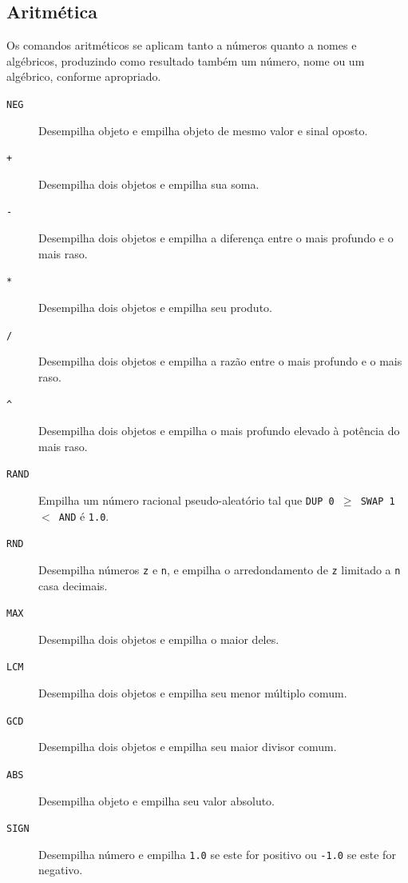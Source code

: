 \documentclass[12pt,a4paper]{report}
\newcommand{\kwd}[1]{\texttt{\textcolor{keyword}{#1}}}
\newcommand{\DUP}{\kwd{DUP}}   %
\newcommand{\SWAP}{\kwd{SWAP}}   %
\newcommand{\AND}{\kwd{AND}}   %
\newcommand{\LESS}{\kwd{$<$}}   %
\newcommand{\GEQ}{\kwd{$\geq$}}   %
\newcommand{\NEG}{\kwd{NEG}}   %
\newcommand{\PLUS}{\kwd{+}}   %
\newcommand{\MINUS}{\kwd{-}}   %
\newcommand{\MUL}{\kwd{*}}   %
\newcommand{\DIV}{\kwd{/}}   %
\newcommand{\POWER}{\kwd{\^{}}}   %
\newcommand{\RAND}{\kwd{RAND}}   %
\newcommand{\RND}{\kwd{RND}}   %
\newcommand{\MAX}{\kwd{MAX}}   %
\newcommand{\LCM}{\kwd{LCM}}   %
\newcommand{\GCD}{\kwd{GCD}}   %
\newcommand{\ABS}{\kwd{ABS}}   %
\newcommand{\SIGN}{\kwd{SIGN}}   %
\numberwithin{theorem}{chapter}
\begin{document}
\subsection{Aritmética}

Os comandos aritméticos se aplicam tanto a números quanto a nomes e
algébricos, produzindo como resultado também um número, nome ou um
algébrico, conforme apropriado.

\begin{description}

  \item[\NEG]\label{NEG} Desempilha objeto e empilha objeto de mesmo
    valor e sinal oposto.

  \item[\PLUS]\label{PLUS} Desempilha dois objetos e empilha sua soma.

  \item[\MINUS]\label{MINUS} Desempilha dois objetos e empilha a
    diferença entre o mais profundo e o mais raso.

  \item[\MUL]\label{MUL} Desempilha dois objetos e empilha seu
    produto.

  \item[\DIV]\label{DIV} Desempilha dois objetos e empilha a razão
    entre o mais profundo e o mais raso.

  \item[\POWER]\label{POWER} Desempilha dois objetos e empilha o mais
    profundo elevado à potência do mais raso.

  \item[\RAND]\label{RAND} Empilha um número racional pseudo-aleatório tal que
    \texttt{\DUP\ 0 \GEQ\ \SWAP\ 1 \LESS\ \AND} é \texttt{1.0}.

  \item[\RND]\label{RND} Desempilha números \texttt{z} e \texttt{n}, e
    empilha o arredondamento de \texttt{z} limitado a \texttt{n} casa
    decimais.

  \item[\MAX]\label{MAX} Desempilha dois objetos e empilha o maior
    deles.

  \item[\LCM]\label{LCM} Desempilha dois objetos e empilha seu menor
    múltiplo comum.

  \item[\GCD]\label{GCD} Desempilha dois objetos e empilha seu maior
    divisor comum.

  \item[\ABS]\label{ABS} Desempilha objeto e empilha seu valor
    absoluto.

  \item[\SIGN]\label{SIGN} Desempilha número e empilha \texttt{1.0} se
    este for positivo ou \texttt{-1.0} se este for negativo.

\end{description}
\end{document}
